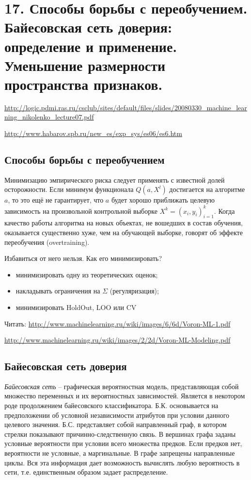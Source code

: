 \documentclass[a4paper,12pt]{article}
\begin{document}
\section*{17. Способы борьбы с переобучением. Байесовская сеть доверия: определение и применение. Уменьшение размерности пространства признаков.}

\url{http://logic.pdmi.ras.ru/csclub/sites/default/files/slides/20080330_machine_learning_nikolenko_lecture07.pdf}

\url{http://www.habarov.spb.ru/new_es/exp_sys/es06/es6.htm}

\subsection*{Способы борьбы с переобучением}
Минимизацию эмпирического риска следует применять с известной долей осторожности. 
Если минимум функционала $Q(a,X^l)$ достигается на алгоритме $a$, то это ещё не гарантирует, что $a$ будет хорошо приближать 
целевую зависимость на произвольной контрольной выборке $X^k = (x_i, y_i )^k_{i=1}$.
Когда качество работы алгоритма на новых объектах, не вошедших в состав обучения, оказывается существенно хуже, чем на обучающей выборке, 
говорят об эффекте переобучения (overtraining).

Избавиться от него нельзя. Как его минимизировать?
\begin{itemize}
    \item минимизировать одну из теоретических оценок;
    \item накладывать ограничения на $\Sigma$ (регуляризация);
    \item минимизировать HoldOut, LOO или CV
\end{itemize}

Читать: 
\url{http://www.machinelearning.ru/wiki/images/6/6d/Voron-ML-1.pdf}

\url{http://www.machinelearning.ru/wiki/images/2/2d/Voron-ML-Modeling.pdf}

\subsection*{Байесовская сеть доверия}
\textit{Байесовская сеть} -- графическая вероятностная модель, представляющая собой множество переменных и их вероятностных зависимостей. Является в некотором роде продолжением байесовского классификатора. Б.К. основывается на предположении об условной независимости атрибутов при условии данного целевого значения. Б.С. представляет собой направленный граф, в котором стрелки показывают причинно-следственную связь. В вершинах графа заданы условные вероятности при условии всего множества предков. Если предков нет, вероятности не условные, а маргинальные. В графе запрещены направленные циклы. Вся эта информация дает возможность вычислять любую вероятность в сети, т.е. единственным образом задает распределение.
\end{document}
